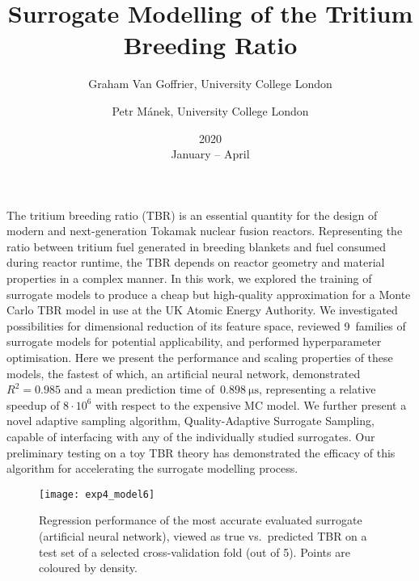 \documentclass{article}
\title{Surrogate Modelling of the Tritium Breeding Ratio}
\date{2020\\ January -- April}
\author{
	Graham Van Goffrier, University College London\\
	\and Petr Mánek, University College London
}
\begin{document}
\maketitle

The tritium breeding ratio (TBR) is an essential quantity for the design of
modern and next-generation Tokamak nuclear fusion reactors. Representing the
ratio between tritium fuel generated in breeding blankets and fuel consumed
during reactor runtime, the TBR depends on reactor geometry and material
properties in a complex manner. In this work, we explored the
training of surrogate models to produce a cheap but high-quality approximation
for a Monte Carlo TBR model in use at the UK Atomic Energy Authority. We
investigated possibilities for dimensional reduction of its feature space, reviewed
9~families of surrogate models for potential
applicability, and performed hyperparameter optimisation. Here we present the
performance and scaling properties of these
models, the fastest of which, an artificial neural network,
demonstrated~$R^2=\num{0.985}$ and a mean
prediction time of~$\SI{0.898}{\micro\second}$, representing a relative speedup of $8\cdot 10^6$
with respect to the expensive MC model. We further present a novel adaptive
sampling algorithm, Quality-Adaptive Surrogate Sampling, capable
of interfacing with any of the individually studied surrogates. Our preliminary
testing on a toy TBR theory has demonstrated the efficacy of this algorithm for
accelerating the surrogate modelling process.

\begin{figure}[h]
	\centering
	\texttt{[image: exp4\_model6]}
	\caption{Regression performance of the most accurate evaluated surrogate
		(artificial neural network), viewed as true vs.~predicted TBR on a test
		set of a selected cross-validation fold (out of 5). Points are coloured by density.}
\end{figure}
\end{document}
